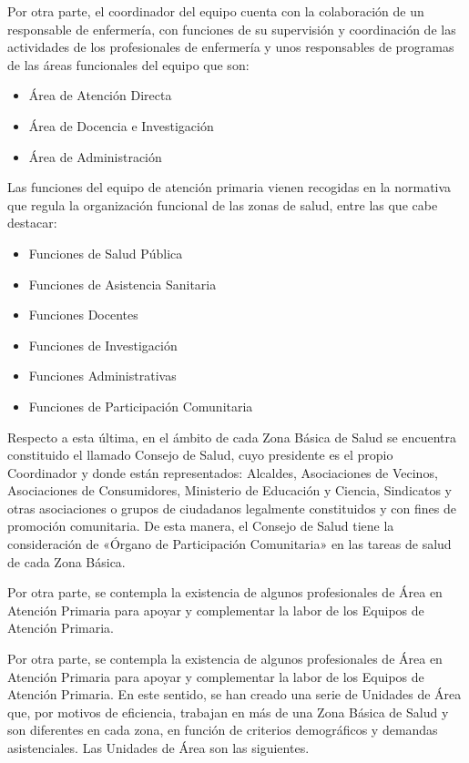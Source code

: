 Por otra parte, el coordinador del equipo cuenta con la colaboración de un responsable de enfermería, con funciones de su supervisión y coordinación de las actividades de los profesionales de enfermería y unos responsables de programas de las áreas funcionales del equipo que son:

\begin{itemize}
    \item Área de Atención Directa
    \item Área de Docencia e Investigación
    \item Área de Administración
\end{itemize}

Las funciones del equipo de atención primaria vienen recogidas en la normativa que regula la organización funcional de las zonas de salud, entre las que cabe destacar:

\begin{itemize}
    \item Funciones de Salud Pública
    \item Funciones de Asistencia Sanitaria
    \item Funciones Docentes
    \item Funciones de Investigación
    \item Funciones Administrativas
    \item Funciones de Participación Comunitaria
\end{itemize}

Respecto a esta última, en el ámbito de cada Zona Básica de Salud se encuentra constituido el llamado Consejo de Salud, cuyo presidente es el propio Coordinador y donde están representados: Alcaldes, Asociaciones de Vecinos, Asociaciones de Consumidores, Ministerio de Educación y Ciencia, Sindicatos y otras asociaciones o grupos de ciudadanos legalmente constituidos y con fines de promoción comunitaria. De esta manera, el Consejo de Salud tiene la consideración de «Órgano de Participación Comunitaria» en las tareas de salud de cada Zona Básica.

Por otra parte, se contempla la existencia de algunos profesionales de Área en Atención Primaria para apoyar y complementar la labor de los Equipos de Atención Primaria.

Por otra parte, se contempla la existencia de algunos profesionales de Área en Atención Primaria para apoyar y complementar la labor de los Equipos de Atención Primaria. En este sentido, se han creado una serie de Unidades de Área que, por motivos de eficiencia, trabajan en más de una Zona Básica de Salud y son diferentes en cada zona, en función de criterios demográficos y demandas asistenciales. Las Unidades de Área son las siguientes.

